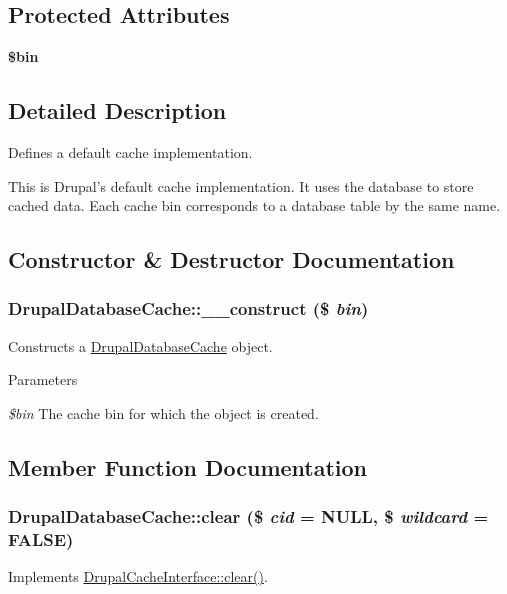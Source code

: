 \subsection*{Protected Attributes}
\begin{DoxyCompactItemize}
\item 
\hypertarget{classDrupalDatabaseCache_a23ff82a8fccd935ca0f443ce94317898}{
{\bfseries \$bin}}
\label{classDrupalDatabaseCache_a23ff82a8fccd935ca0f443ce94317898}

\end{DoxyCompactItemize}


\subsection{Detailed Description}
Defines a default cache implementation.

This is Drupal's default cache implementation. It uses the database to store cached data. Each cache bin corresponds to a database table by the same name. 

\subsection{Constructor \& Destructor Documentation}
\hypertarget{classDrupalDatabaseCache_aacdbd5ca89efaaa78ab8d66fca003cc4}{
\subsubsection[{\_\-\_\-construct}]{\setlength{\rightskip}{0pt plus 5cm}DrupalDatabaseCache::\_\-\_\-construct (\$ {\em bin})}}
\label{classDrupalDatabaseCache_aacdbd5ca89efaaa78ab8d66fca003cc4}
Constructs a \hyperlink{classDrupalDatabaseCache}{DrupalDatabaseCache} object.


\begin{DoxyParams}{Parameters}
\item[{\em \$bin}]The cache bin for which the object is created. \end{DoxyParams}


\subsection{Member Function Documentation}
\hypertarget{classDrupalDatabaseCache_a07b7a236787af4e11615f26dd98f51f7}{
\subsubsection[{clear}]{\setlength{\rightskip}{0pt plus 5cm}DrupalDatabaseCache::clear (\$ {\em cid} = {\ttfamily NULL}, \/  \$ {\em wildcard} = {\ttfamily FALSE})}}
\label{classDrupalDatabaseCache_a07b7a236787af4e11615f26dd98f51f7}
Implements \hyperlink{interfaceDrupalCacheInterface_a5c8e341f653337185feff4ddc30c1b48}{DrupalCacheInterface::clear()}. 

